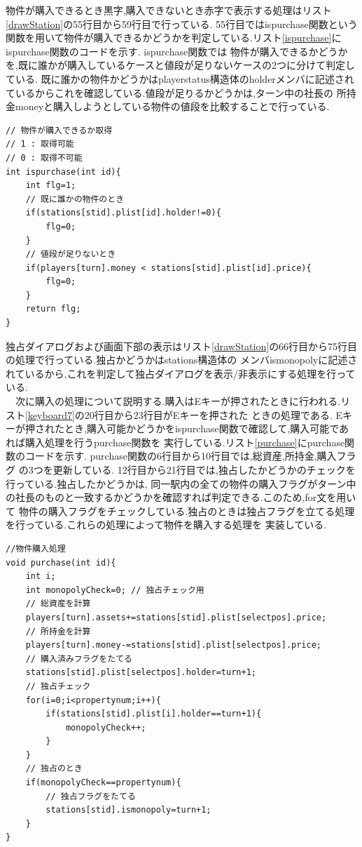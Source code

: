 \documentclass[a4j]{jarticle}
\begin{document}
    物件が購入できるとき黒字,購入できないとき赤字で表示する処理はリスト\ref{drawStation}の55行目から59行目で行っている. 55行目ではispurchase関数という
    関数を用いて物件が購入できるかどうかを判定している.リスト\ref{ispurchase}にispurchase関数のコードを示す. ispurchase関数では
    物件が購入できるかどうかを,既に誰かが購入しているケースと値段が足りないケースの2つに分けて判定している.
    既に誰かの物件かどうかはplayerstatus構造体のholderメンバに記述されているからこれを確認している.値段が足りるかどうかは,ターン中の社長の
    所持金moneyと購入しようとしている物件の値段を比較することで行っている.
    \begin{lstlisting}[basicstyle=\ttfamily\footnotesize, frame=single,label=ispurchase,caption=ispurchase関数]
// 物件が購入できるか取得
// 1 : 取得可能
// 0 : 取得不可能
int ispurchase(int id){
    int flg=1;
    // 既に誰かの物件のとき
    if(stations[stid].plist[id].holder!=0){
        flg=0;
    }
    // 値段が足りないとき
    if(players[turn].money < stations[stid].plist[id].price){ 
        flg=0;
    }
    return flg;
}
    \end{lstlisting} 

    独占ダイアログおよび画面下部の表示はリスト\ref{drawStation}の66行目から75行目の処理で行っている.独占かどうかはstations構造体の
    メンバismonopolyに記述されているから,これを判定して独占ダイアログを表示/非表示にする処理を行っている.\\
    　次に購入の処理について説明する.購入はEキーが押されたときに行われる.リスト\ref{keyboard7}の20行目から23行目がEキーを押された
    ときの処理である. Eキーが押されたとき,購入可能かどうかをispurchase関数で確認して,購入可能であれば購入処理を行うpurchase関数を
    実行している.リスト\ref{purchase}にpurchase関数のコードを示す. purchase関数の6行目から10行目では,総資産,所持金,購入フラグ
    の3つを更新している. 12行目から21行目では,独占したかどうかのチェックを行っている.独占したかどうかは,
    同一駅内の全ての物件の購入フラグがターン中の社長のものと一致するかどうかを確認すれば判定できる.このため,for文を用いて
    物件の購入フラグをチェックしている.独占のときは独占フラグを立てる処理を行っている.これらの処理によって物件を購入する処理を
    実装している.
    \begin{lstlisting}[basicstyle=\ttfamily\footnotesize, frame=single,label=purchase,caption=purchase関数]
//物件購入処理
void purchase(int id){
    int i;
    int monopolyCheck=0; // 独占チェック用
    // 総資産を計算
    players[turn].assets+=stations[stid].plist[selectpos].price;
    // 所持金を計算
    players[turn].money-=stations[stid].plist[selectpos].price;
    // 購入済みフラグをたてる
    stations[stid].plist[selectpos].holder=turn+1;    
    // 独占チェック
    for(i=0;i<propertynum;i++){
        if(stations[stid].plist[i].holder==turn+1){
            monopolyCheck++;
        }
    }    
    // 独占のとき
    if(monopolyCheck==propertynum){
        // 独占フラグをたてる
        stations[stid].ismonopoly=turn+1;
    }    
}
    \end{lstlisting} 
    
\end{document}
